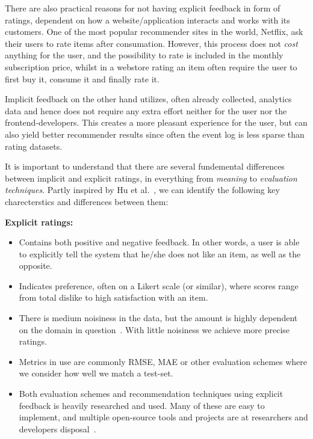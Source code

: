 There are also practical reasons for not having explicit feedback in form of
ratings, dependent on how a website/application interacts and works with its
customers. One of the most popular recommender sites in the world, Netflix, ask
their users to rate items after consumation. However, this process does not
\textit{cost} anything for the user, and the possibility to rate is included in
the monthly subscription price, whilst in a webstore rating an item often
require the user to first buy it, consume it and finally rate it. 

Implicit feedback on the other hand utilizes, often already collected,
analytics data and hence does not require any extra effort neither for the user
nor the frontend-developers. This creates a more pleasant experience for the
user, but can also yield better recommender results since often the event log
is less sparse than rating datasets.

It is important to understand that there are several fundemental differences
between implicit and explicit ratings, in everything from \textit{meaning} to
\textit{evaluation techniques}. Partly inspired by Hu et al.~\cite{Hu2008}, we
can identify the following key charecterstics and differences between them: 

\textbf{Explicit ratings:}
\begin{itemize}
\item Contains both positive and negative feedback. In other words, a user is
able to explicitly tell the system that he/she does not like an item, as well
as the opposite.
\item Indicates preference, often on a Likert scale (or similar), where scores
range from total dislike to high satisfaction with an item.
\item There is medium noisiness in the data, but the amount is highly dependent
on the domain in question~\cite{amatriain2009like}. With little noisiness we
achieve more precise ratings.
\item Metrics in use are commonly RMSE, MAE or other evaluation schemes where
we consider how well we match a test-set.
\item Both evaluation schemes and recommendation techniques using explicit
feedback is heavily researched and used. Many of these are easy to implement,
and multiple open-source tools and projects are at researchers and developers
disposal~\cite{something}.
\end{itemize}

